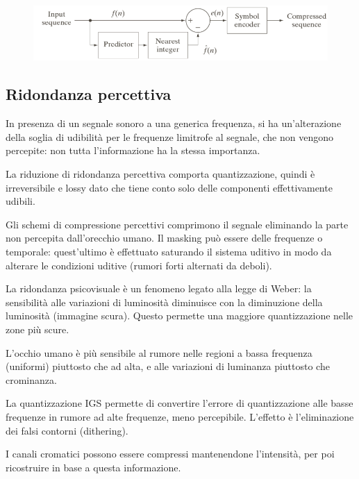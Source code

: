 \begin{figure}[h]
	\centering
	\includegraphics[scale=0.5]{Lezioni/Immagini/codificapredittiva}
\end{figure}

\subsection{Ridondanza percettiva}
In presenza di un segnale sonoro a una generica frequenza, si ha un'alterazione della soglia di udibilità per le frequenze limitrofe al segnale, che non vengono percepite: non tutta l'informazione ha la stessa importanza. 

La riduzione di ridondanza percettiva comporta quantizzazione, quindi è irreversibile e lossy dato che tiene conto solo delle componenti effettivamente udibili.

Gli schemi di compressione percettivi comprimono il segnale eliminando la parte non percepita dall'orecchio umano. Il masking può essere delle frequenze o temporale: quest'ultimo è effettuato saturando il sistema uditivo in modo da alterare le condizioni uditive (rumori forti alternati da deboli).

La ridondanza psicovisuale è un fenomeno legato alla legge di Weber: la sensibilità alle variazioni di luminosità diminuisce con la diminuzione della luminosità (immagine scura). Questo permette una maggiore quantizzazione nelle zone più scure.

L'occhio umano è più sensibile al rumore nelle regioni a bassa frequenza (uniformi) piuttosto che ad alta, e alle variazioni di luminanza piuttosto che crominanza. 

La quantizzazione IGS permette di convertire l'errore di quantizzazione alle basse frequenze in rumore ad alte frequenze, meno percepibile. L'effetto è l'eliminazione dei falsi contorni (dithering). 

I canali cromatici possono essere compressi mantenendone l'intensità, per poi ricostruire in base a questa informazione. 

